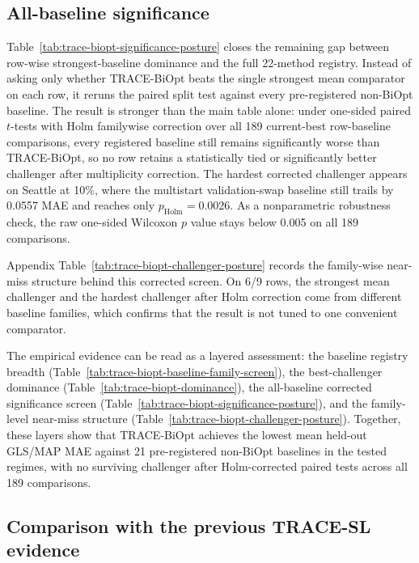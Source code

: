 \subsection{All-baseline significance}

Table~\ref{tab:trace-biopt-significance-posture} closes the remaining gap
between row-wise strongest-baseline dominance and the full 22-method registry.
Instead of asking only whether TRACE-BiOpt beats the single strongest mean
comparator on each row, it reruns the paired split test against every
pre-registered non-BiOpt baseline. The result is stronger than the main table
alone: under one-sided paired $t$-tests with Holm familywise correction over
all 189 current-best row-baseline comparisons, every registered baseline still
remains significantly worse than TRACE-BiOpt, so no row retains a statistically
tied or significantly better challenger after multiplicity correction. The
hardest corrected challenger appears on Seattle at 10\%, where the multistart
validation-swap baseline still trails by 0.0557 MAE and reaches only
$p_{\mathrm{Holm}}=0.0026$. As a nonparametric robustness check, the raw
one-sided Wilcoxon $p$ value stays below 0.005 on all 189 comparisons.


\FloatBarrier

Appendix Table~\ref{tab:trace-biopt-challenger-posture} records the family-wise
near-miss structure behind this corrected screen. On 6/9 rows, the strongest
mean challenger and the hardest challenger after Holm correction come from
different baseline families, which confirms that the result is not tuned to one
convenient comparator.

The empirical evidence can be read as a layered assessment: the baseline registry breadth (Table~\ref{tab:trace-biopt-baseline-family-screen}), the best-challenger dominance (Table~\ref{tab:trace-biopt-dominance}), the all-baseline corrected significance screen (Table~\ref{tab:trace-biopt-significance-posture}), and the family-level near-miss structure (Table~\ref{tab:trace-biopt-challenger-posture}). Together, these layers show that TRACE-BiOpt achieves the lowest mean held-out GLS/MAP MAE against 21 pre-registered non-BiOpt baselines in the tested regimes, with no surviving challenger after Holm-corrected paired tests across all 189 comparisons.


\subsection{Comparison with the previous TRACE-SL evidence}

